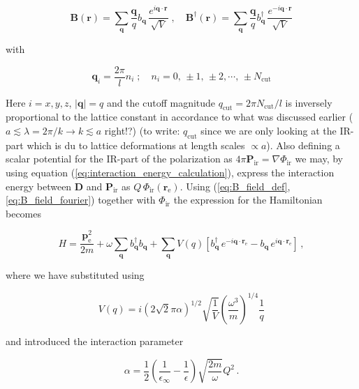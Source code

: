 \documentclass[12pt]{report}
\renewcommand{\vec}[1]{\boldsymbol{\mathbf{#1}}}                        %
\newcommand{\motivation}[1]{{\leavevmode\color{motivation}#1}}
\newcommand{\todo}[1]{{\leavevmode\color{todo}#1}}
\begin{document}
\begin{equation}
	\label{eq:B_field_fourier}
	\vec B (\vec r) = \sum_{\vec q} \frac{\vec q}{q} b_{\vec q} \, \frac{e^{i \vec q \cdot \vec r}}{\sqrt V}
	\; , \quad
	\vec B^\dagger (\vec r) = \sum_{\vec q} \frac{\vec q}{q} b^\dagger_{\vec q} \, \frac{e^{-i \vec q \cdot \vec r}}{\sqrt V}
\end{equation}

with

\begin{equation}
	\vec q_i = \frac{2\pi}{l} n_i
	\; ; \quad 
	n_i = 0, \, \pm 1, \, \pm 2, \cdots , \, \pm N_\text{cut}
\end{equation}

Here  $ i = x, y, z $, $ | \vec q | = q $ and the cutoff magnitude $ q_\text{cut} = 2 \pi N_\text{cut} / l $ is inversely proportional to the lattice constant in accordance to what was discussed earlier \motivation{($ a \lesssim \lambda = 2 \pi / k \rightarrow k \lesssim a $ right!?)} \todo{(to write: $ q_\text{cut} $ since we are only looking at the IR-part which is du to lattice deformations at length scales $ \propto  a $)}. Also defining a scalar potential for the IR-part of the polarization as $ 4 \pi \vec P_\text{ir} = \nabla \Phi_\text{ir} $ we may, by using equation (\ref{eq:interaction_energy_calculation}), express the interaction energy between $ \vec D $ and $ \vec P_\text{ir} $ as $ Q \, \Phi_\text{ir} (\vec r_\text{e}) $. Using (\ref{eq:B_field_def}, \ref{eq:B_field_fourier}) together with $ \Phi_\text{ir} $ the expression for the Hamiltonian becomes

\begin{equation}
	H = \frac{\vec p_\text{e}^2}{2m}
	+ \omega \sum_{\vec q} b^\dagger_{\vec q} b_{\vec q}
	+ \sum_{\vec q} V(q) \left[ b^\dagger_{\vec q} \, e^{-i \vec q \cdot \vec r_\text{e}} - b_{\vec q} \, e^{i \vec q \cdot \vec r_\text{e}} \right] \,,
\end{equation}

where we have substituted using

\begin{equation}
	V(q) = i \left( 2 \sqrt 2 \pi \alpha \right)^{1/2} \sqrt{ \frac{1}{V} } \left( \frac{\omega^3}{m} \right)^{1/4} \frac{1}{q}
\end{equation}

and introduced the interaction parameter

\begin{equation}
	\alpha = \frac{1}{2} \left( \frac{1}{\epsilon_\infty} - \frac{1}{\epsilon} \right) \sqrt{ \frac{2m}{\omega} } Q^2 \,.
\end{equation}
\end{document}
